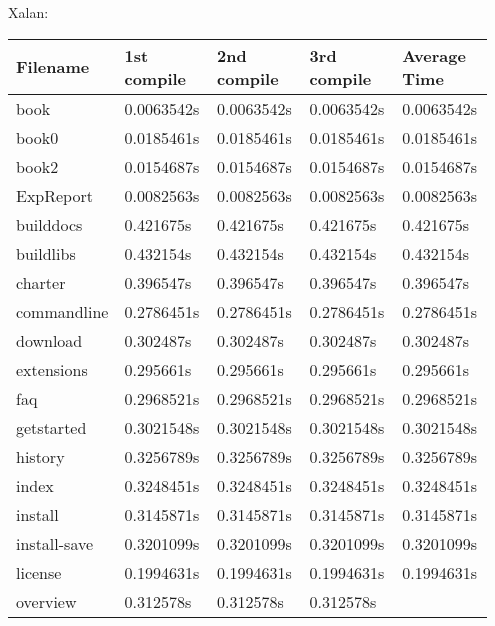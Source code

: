\documentclass[letterpaper,10pt,titlepage]{article}
\begin{document}
Xalan:
\begin{longtable}{ | p{0.15\linewidth} | p{0.2\linewidth} | p{0.2\linewidth} | p{0.2\linewidth} | p{0.2\linewidth} |}\hline
  Filename & 1st compile & 2nd compile  & 3rd compile & Average Time \\ \hline
  	book &
    0.0063542s &
    0.0063542s &
    0.0063542s &
    0.0063542s \\
  \hline
  	book0 &
    0.0185461s &
    0.0185461s &
    0.0185461s &
    0.0185461s\\
  \hline
    book2 &
    0.0154687s &
    0.0154687s &
    0.0154687s &
    0.0154687s\\
    \hline
    ExpReport &
    0.0082563s &
    0.0082563s &
    0.0082563s &
    0.0082563s\\
    \hline
    builddocs &
    0.421675s &
    0.421675s &
    0.421675s &
    0.421675s \\
    \hline
    buildlibs &
    0.432154s &
    0.432154s &
    0.432154s &
    0.432154s \\
    \hline
    charter &
    0.396547s &
    0.396547s &
    0.396547s &
    0.396547s \\
    \hline
    commandline &
    0.2786451s &
    0.2786451s &
    0.2786451s &
    0.2786451s \\
    \hline
    download &
    0.302487s &
    0.302487s &
    0.302487s &
    0.302487s \\
    \hline
    extensions &
    0.295661s &
    0.295661s &
    0.295661s &
    0.295661s \\
    \hline
    faq &
    0.2968521s &
    0.2968521s &
    0.2968521s &
    0.2968521s \\
    \hline
    getstarted &
    0.3021548s &
    0.3021548s &
    0.3021548s &
    0.3021548s \\
    \hline
    history &
    0.3256789s &
    0.3256789s &
    0.3256789s &
    0.3256789s \\
    \hline
    index &
    0.3248451s &
    0.3248451s &
    0.3248451s &
    0.3248451s \\
    \hline
    install &
    0.3145871s &
    0.3145871s &
    0.3145871s &
    0.3145871s \\
    \hline
    install-save &
    0.3201099s &
    0.3201099s &
    0.3201099s &
    0.3201099s \\
    \hline
    license &
    0.1994631s &
    0.1994631s &
    0.1994631s &
    0.1994631s \\
    \hline
    overview &
    0.312578s &
    0.312578s &
    0.312578s &

\end{longtable}
\end{document}
